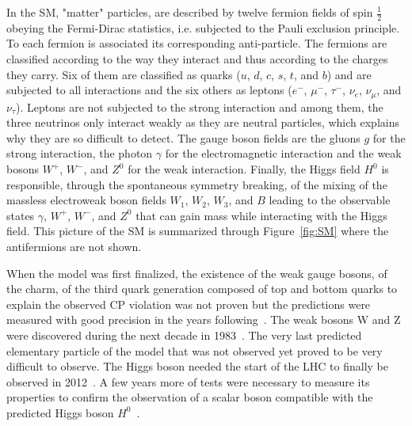 	In the SM, "matter" particles, are described by twelve fermion fields of spin $\frac{1}{2}$ obeying the Fermi-Dirac statistics, i.e. subjected to the Pauli exclusion principle. To each fermion is associated its corresponding anti-particle. The fermions are classified according to the way they interact and thus according to the charges they carry. Six of them are classified as quarks ($u$, $d$, $c$, $s$, $t$, and $b$) and are subjected to all interactions and the six others as leptons ($e^-$, $\mu^-$, $\tau^-$, $\nu_e$, $\nu_\mu$, and $\nu_\tau$). Leptons are not subjected to the strong interaction and among them, the three neutrinos only interact weakly as they are neutral particles, which explains why they are so difficult to detect. The gauge boson fields are the gluons $g$ for the strong interaction, the photon $\gamma$ for the electromagnetic interaction and the weak bosons $W^+$, $W^-$, and $Z^0$ for the weak interaction. Finally, the Higgs field $H^0$ is responsible, through the spontaneous symmetry breaking, of the mixing of the massless electroweak boson fields $W_1$, $W_2$, $W_3$, and $B$ leading to the observable states $\gamma$, $W^+$, $W^-$, and $Z^0$ that can gain mass while interacting with the Higgs field. This picture of the SM is summarized through Figure~\ref{fig:SM} where the antifermions are not shown.
	
	When the model was first finalized, the existence of the weak gauge bosons, of the charm, of the third quark generation composed of top and bottom quarks to explain the observed CP violation was not proven but the predictions were measured with good precision in the years following~\cite{TING1974,RICHTER1974,HERB1977,ABASHI1995,ABE1995}. The weak bosons W and Z were discovered during the next decade in 1983~\cite{UA1W1983,UA2W1983,UA1Z1983,UA2Z1983}. The very last predicted elementary particle of the model that was not observed yet proved to be very difficult to observe. The Higgs boson needed the start of the LHC to finally be observed in 2012~\cite{ATLAS2012,CMS2012}. A few years more of tests were necessary to measure its properties to confirm the observation of a scalar boson compatible with the predicted Higgs boson $H^0$~\cite{HIGGS2015}.
	
